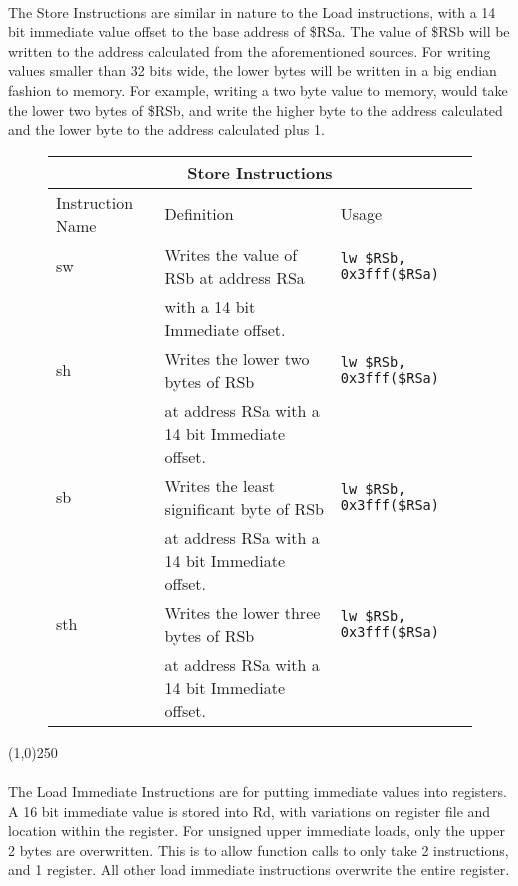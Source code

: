 \documentclass[letterpaper, 11pt]{article}
\begin{document}
\paragraph{} The Store Instructions are similar in nature to the Load instructions, with a 14 bit immediate value offset to the base address of \$RSa.
The value of \$RSb will be written to the address calculated from the aforementioned sources. For writing values smaller than 32 bits wide, the lower
bytes will be written in a big endian fashion to memory. For example, writing a two byte value to memory, would take the lower two bytes of \$RSb, and write
the higher byte to the address calculated and the lower byte to the address calculated plus 1. 
\begin{figure}[!h]
	\begin{center}
		\begin{tabular}{|l|l|l|}
			\hline
			\multicolumn{3}{c}{Store Instructions} \\ \hline
			Instruction Name	& Definition											& Usage 							\\ \hline
			sw					& Writes the value of RSb at address RSa				& \texttt{lw \$RSb, 0x3fff(\$RSa)}	\\ 
			\hfill				& with a 14 bit Immediate offset.						& \hfill 							\\ \hline
			sh					& Writes the lower two bytes of RSb 					& \texttt{lw \$RSb, 0x3fff(\$RSa)}	\\ 
			\hfill				& at address RSa with a 14 bit Immediate offset.		& \hfill 							\\ \hline
			sb					& Writes the least significant byte of RSb 				& \texttt{lw \$RSb, 0x3fff(\$RSa)}	\\ 
			\hfill				& at address RSa with a 14 bit Immediate offset.		& \hfill 							\\ \hline
			sth					& Writes the lower three bytes of RSb 					& \texttt{lw \$RSb, 0x3fff(\$RSa)}	\\ 
			\hfill				& at address RSa with a 14 bit Immediate offset.		& \hfill 							\\ \hline
		 		\end{tabular} 
	\end{center}
	
\end{figure}

\begin{center}
	\line(1,0){250}
\end{center}
\clearpage
\paragraph{} The Load Immediate Instructions are for putting immediate values into registers. A 16 bit immediate value is stored into Rd, with variations on
register file and location within the register. For unsigned upper immediate loads, only the upper 2 bytes are
overwritten. This is to allow function calls to only take 2 instructions, and 1 register. All other
load immediate instructions overwrite the entire register.
\end{document}
